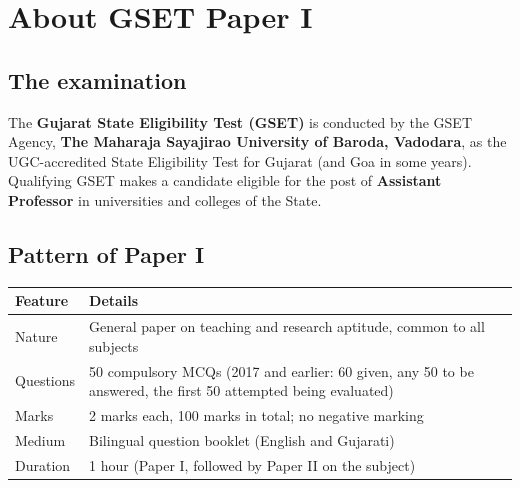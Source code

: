 \chapter*{About GSET Paper I}

\section*{The examination}
The \textbf{Gujarat State Eligibility Test (GSET)} is conducted by the GSET Agency, \textbf{The Maharaja Sayajirao University of Baroda, Vadodara}, as the UGC-accredited State Eligibility Test for Gujarat (and Goa in some years). Qualifying GSET makes a candidate eligible for the post of \textbf{Assistant Professor} in universities and colleges of the State.

\section*{Pattern of Paper I}
\begin{center}\small
\begin{tabularx}{\linewidth}{@{}lX@{}}\toprule
\textbf{Feature} & \textbf{Details}\\\midrule
Nature & General paper on teaching and research aptitude, common to all subjects\\
Questions & 50 compulsory MCQs (2017 and earlier: 60 given, any 50 to be answered, the first 50 attempted being evaluated)\\
Marks & 2 marks each, 100 marks in total; no negative marking\\
Medium & Bilingual question booklet (English and Gujarati)\\
Duration & 1 hour (Paper I, followed by Paper II on the subject)\\\bottomrule
\end{tabularx}
\end{center}


